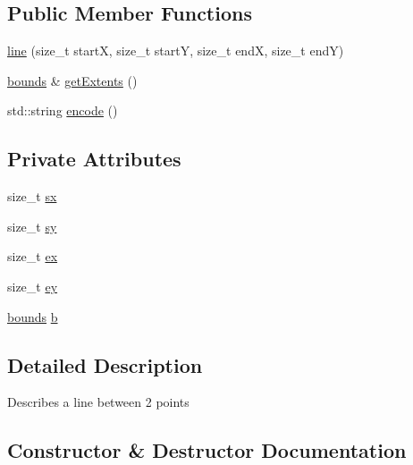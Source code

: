 \subsection*{Public Member Functions}
\begin{DoxyCompactItemize}
\item 
\hyperlink{classgraphics_1_1line_a4473fc0ec2635c877b91b338a78e4ac8}{line} (size\+\_\+t startX, size\+\_\+t startY, size\+\_\+t endX, size\+\_\+t endY)
\item 
\hyperlink{classgraphics_1_1bounds}{bounds} \& \hyperlink{classgraphics_1_1line_a73ce35db1d98c6bd869a8bef10d8e1bd}{get\+Extents} ()
\item 
std\+::string \hyperlink{classgraphics_1_1line_abb6a2d1e6d2c9fdd8d26bae1c15f5356}{encode} ()
\end{DoxyCompactItemize}
\subsection*{Private Attributes}
\begin{DoxyCompactItemize}
\item 
size\+\_\+t \hyperlink{classgraphics_1_1line_a9f017c004983fbfa5c21d88b8b29d5de}{sx}
\item 
size\+\_\+t \hyperlink{classgraphics_1_1line_ac4c6f1e0eccd02b3399d091736c0903c}{sy}
\item 
size\+\_\+t \hyperlink{classgraphics_1_1line_ac3cc564cf12b6001ff01569dd46074a1}{ex}
\item 
size\+\_\+t \hyperlink{classgraphics_1_1line_a3ec687141bc383f58256cd3e4f614b55}{ey}
\item 
\hyperlink{classgraphics_1_1bounds}{bounds} \hyperlink{classgraphics_1_1line_ab8b7e54fde92e99de480b3ce9d8a167f}{b}
\end{DoxyCompactItemize}


\subsection{Detailed Description}
Describes a line between 2 points 

\subsection{Constructor \& Destructor Documentation}
